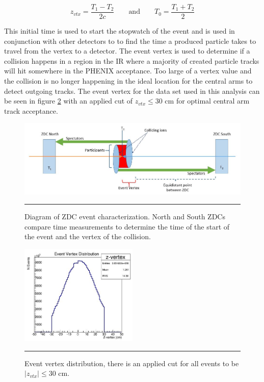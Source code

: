 \begin{equation}
 z_{vtx} = \frac{T_1 - T_2}{2c} \qquad\text{and}\qquad T_0 = \frac{T_1 + T_2}{2}
\end{equation}

This initial time is used to start the stopwatch of the event and is used in conjunction with other detectors to to find the time a produced particle takes to travel from the vertex to a detector. The event vertex is used to determine if a collision happens in a region in the IR where a majority of created particle tracks will hit somewhere in the PHENIX acceptance. Too large of a vertex value and the collision is no longer happening in the ideal location for the central arms to detect outgoing tracks. The event vertex for the data set used in this analysis can be seen in figure \ref{fig:vtxdist} with an applied cut of $z_{vtx} \leq 30$ cm for optimal central arm track acceptance.

\begin{figure}[htbp!]
  \centering
    \includegraphics[width=1\textwidth]{Figures/BBCevtchar.JPG}
    \rule{35em}{0.5pt}
  \caption[Diagram of ZDC event characterization]{Diagram of ZDC event characterization. North and South ZDCs compare time measurements to determine the time of the start of the event and the vertex of the collision.}
  \label{fig:zdcvtx}
\end{figure}


\begin{figure}[htbp!]
  \centering
    \includegraphics[width=0.5\textwidth]{evtQA/zvtxdist.JPG}
    \rule{35em}{0.5pt}
  \caption[Event Vertex Distribution]{Event vertex distribution, there is an applied cut for all events to be $|z_{vtx}| \leq 30$ cm.}
  \label{fig:vtxdist}
\end{figure}

